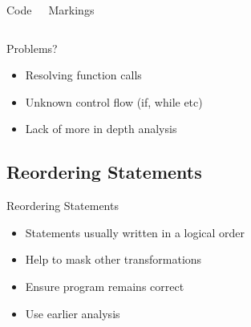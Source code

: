 \begin{frame}
\begin{columns}[t]
{\begin{block}{Code}
\end{block}
\begin{block}{Markings}
\begin{itemize}
\end{itemize}
\end{block}}
\end{columns}
\end{frame}

\begin{frame}{Problems?}
\begin{itemize}
\item Resolving function calls
\item Unknown control flow (if, while etc)
\item Lack of more in depth analysis
\end{itemize}
\end{frame}


\subsection{Reordering Statements}

\begin{frame}{Reordering Statements}
\begin{itemize}
\item Statements usually written in a logical order
\item Help to mask other transformations
\item Ensure program remains correct
\item Use earlier analysis
\end{itemize}
\end{frame}

